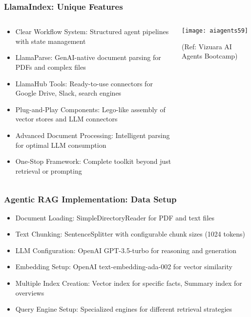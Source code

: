 \begin{frame}[fragile]\frametitle{LlamaIndex: Unique Features}
\begin{columns}
    \begin{column}[T]{0.6\linewidth}
      \begin{itemize}
		\item Clear Workflow System: Structured agent pipelines with state management
		\item LlamaParse: GenAI-native document parsing for PDFs and complex files
		\item LlamaHub Tools: Ready-to-use connectors for Google Drive, Slack, search engines
		\item Plug-and-Play Components: Lego-like assembly of vector stores and LLM connectors
		\item Advanced Document Processing: Intelligent parsing for optimal LLM consumption
		\item One-Stop Framework: Complete toolkit beyond just retrieval or prompting
	  \end{itemize}
    \end{column}
    \begin{column}[T]{0.4\linewidth}
		\begin{center}
		\texttt{[image: aiagents59]}
		
		{\tiny (Ref: Vizuara AI Agents Bootcamp)}
		\end{center}	
    \end{column}
  \end{columns}
\end{frame}


\begin{frame}[fragile]\frametitle{Agentic RAG Implementation: Data Setup}

      \begin{itemize}
		\item Document Loading: SimpleDirectoryReader for PDF and text files
		\item Text Chunking: SentenceSplitter with configurable chunk sizes (1024 tokens)
		\item LLM Configuration: OpenAI GPT-3.5-turbo for reasoning and generation
		\item Embedding Setup: OpenAI text-embedding-ada-002 for vector similarity
		\item Multiple Index Creation: Vector index for specific facts, Summary index for overviews
		\item Query Engine Setup: Specialized engines for different retrieval strategies
	  \end{itemize}


\end{frame}

